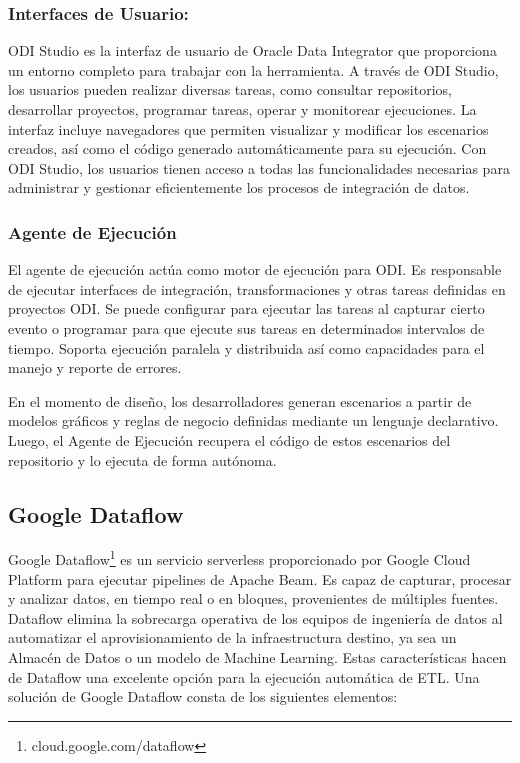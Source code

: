 \subsubsection{Interfaces de Usuario:}

ODI Studio es la interfaz de usuario de Oracle Data Integrator que proporciona un entorno completo para trabajar con la 
herramienta. A través de ODI Studio, los usuarios pueden realizar diversas tareas, como consultar repositorios, desarrollar 
proyectos, programar tareas, operar y monitorear ejecuciones. La interfaz incluye navegadores que permiten visualizar y 
modificar los escenarios creados, así como el código generado automáticamente para su ejecución. Con ODI Studio, los 
usuarios tienen acceso a todas las funcionalidades necesarias para administrar y gestionar eficientemente los procesos de 
integración de datos. 

\subsubsection{Agente de Ejecución}

El agente de ejecución actúa como motor de ejecución para ODI. Es responsable de ejecutar interfaces de integración, 
transformaciones y otras tareas definidas en proyectos ODI. Se puede configurar para ejecutar las tareas al capturar 
cierto evento o programar para que ejecute sus tareas en determinados intervalos de tiempo. Soporta ejecución paralela
y distribuida as\'i como capacidades para el manejo y reporte de errores.

En el momento de diseño, los desarrolladores generan escenarios a partir de modelos gráficos y reglas de negocio 
definidas mediante un lenguaje declarativo. Luego, el Agente de Ejecución recupera el código de estos escenarios 
del repositorio y lo ejecuta de forma autónoma. 





\subsection{Google Dataflow}

Google Dataflow\footnote{cloud.google.com/dataflow} es un servicio serverless proporcionado por Google Cloud Platform para ejecutar pipelines de Apache Beam. 
Es capaz de capturar, procesar y analizar datos, en tiempo real o en bloques, provenientes de m\'ultiples fuentes.
Dataflow elimina la sobrecarga operativa de los equipos de ingeniería de datos al automatizar el aprovisionamiento de la
infraestructura destino, ya sea un Almacén de Datos o un modelo de Machine Learning. Estas características hacen de 
Dataflow una excelente opción para la ejecución automática de ETL. Una solución de Google Dataflow consta de los 
siguientes elementos:

